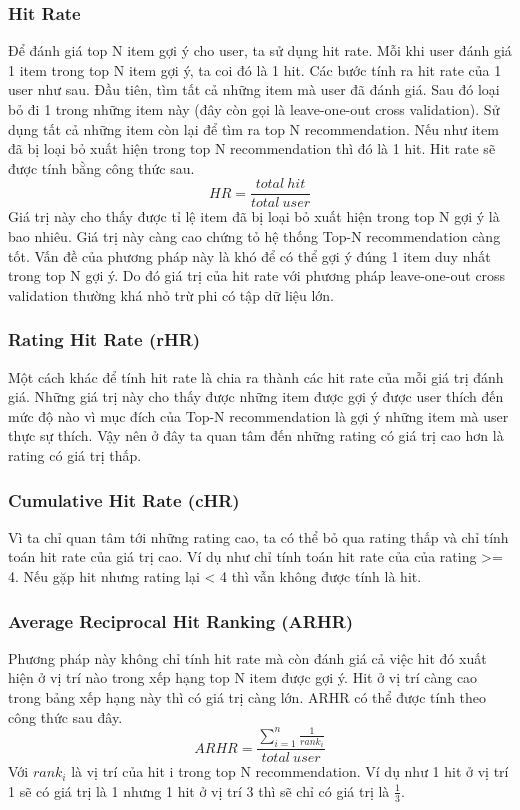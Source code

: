 \subsubsection{Hit Rate}
Để đánh giá top N item gợi ý cho user, ta sử dụng hit rate. Mỗi khi user đánh giá 1 item trong top N item gợi ý, ta coi đó là 1 hit.
\newline Các bước tính ra hit rate của 1 user như sau. Đầu tiên, tìm tất cả những item mà user đã đánh giá. Sau đó loại bỏ đi 1 trong những item này (đây còn gọi là leave-one-out cross validation). Sử dụng tất cả những item còn lại để tìm ra top N recommendation. Nếu như item đã bị loại bỏ xuất hiện trong top N recommendation thì đó là 1 hit. 
Hit rate sẽ được tính bằng công thức sau.
\begin{equation}
    HR = \frac{total \: hit}{total \: user}
\end{equation}
Giá trị này cho thấy được tỉ lệ item đã bị loại bỏ xuất hiện trong top N gợi ý là bao nhiêu. Giá trị này càng cao chứng tỏ hệ thống Top-N recommendation càng tốt.
\newline Vấn đề của phương pháp này là khó để có thể gợi ý đúng 1 item duy nhất trong top N gợi ý. Do đó giá trị của hit rate với phương pháp leave-one-out cross validation thường khá nhỏ trừ phi có tập dữ liệu lớn.

\subsubsection{Rating Hit Rate (rHR)}
Một cách khác để tính hit rate là chia ra thành các hit rate của mỗi giá trị đánh giá. Những giá trị này cho thấy được những item được gợi ý được user thích đến mức độ nào vì mục đích của Top-N recommendation là gợi ý những item mà user thực sự thích. Vậy nên ở đây ta quan tâm đến những rating có giá trị cao hơn là rating có giá trị thấp.

\subsubsection{Cumulative Hit Rate (cHR)}
Vì ta chỉ quan tâm tới những rating cao, ta có thể bỏ qua rating thấp và chỉ tính toán hit rate của giá trị cao. Ví dụ như chỉ tính toán hit rate của của rating >= 4. Nếu gặp hit nhưng rating lại < 4 thì vẫn không được tính là hit.

\subsubsection{Average Reciprocal Hit Ranking (ARHR)}
Phương pháp này không chỉ tính hit rate mà còn đánh giá cả việc hit đó xuất hiện ở vị trí nào trong xếp hạng top N item được gợi ý. Hit ở vị trí càng cao trong bảng xếp hạng này thì có giá trị càng lớn. ARHR có thể được tính theo công thức sau đây.
\begin{equation}
    ARHR = \frac{\sum^n_{i=1} \frac{1}{rank_i}}{total \: user}
\end{equation}
Với $rank_i$ là vị trí của hit i trong top N recommendation. Ví dụ như 1 hit ở vị trí 1 sẽ có giá trị là 1 nhưng 1 hit ở vị trí 3 thì sẽ chỉ có giá trị là $\frac{1}{3}$.
